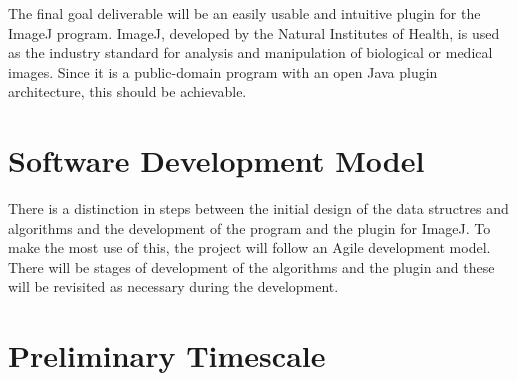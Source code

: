 The final goal deliverable will be an easily usable and intuitive plugin for
the ImageJ program. ImageJ\cite{rasband1997imagej}, developed by the Natural
Institutes of Health, is used as the industry standard for analysis and
manipulation of biological or medical images. Since it is a public-domain
program with an open Java plugin architecture, this should be achievable.

\section{Software Development Model}
\label{sec:software_development_model}

There is a distinction in steps between the initial design of the data
structres and algorithms and the development of the program and the plugin for
ImageJ. To make the most use of this, the project will follow an Agile
development model. There will be stages of development of the algorithms and
the plugin and these will be revisited as necessary during the development.

\section{Preliminary Timescale}
\label{sec:preliminary_timescale}

